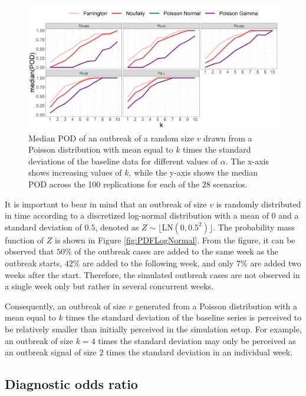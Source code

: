 \documentclass[preprint, 3p, authoryear]{elsarticle} %
\begin{document}
\begin{figure}[H]
\includegraphics[width=1\linewidth]{../../figures/POD_alpha_methods_median} \caption{Median POD of an outbreak of a random size \(v\) drawn from a Poisson distribution with mean equal to \(k\) times the standard deviations of the baseline data for different values of \(\alpha\). The x-axis shows increasing values of \(k\), while the y-axis shows the median POD across the 100 replications for each of the 28 scenarios.}\label{fig:PODalphamethodsmedian}
\end{figure}

It is important to bear in mind that an outbreak of size \(v\) is randomly distributed in time according to a discretized log-normal distribution with a mean of \(0\) and a standard deviation of \(0.5\), denoted as \(Z \sim \lfloor \mathrm{LN}(0,0.5^2)\rfloor\). The probability mass function of \(Z\) is shown in Figure \ref{fig:PDFLogNormal}. From the figure, it can be observed that \(50\%\) of the outbreak cases are added to the same week as the outbreak starts, \(42\%\) are added to the following week, and only \(7\%\) are added two weeks after the start. Therefore, the simulated outbreak cases are not observed in a single week only but rather in several concurrent weeks.

Consequently, an outbreak of size \(v\) generated from a Poisson distribution with a mean equal to \(k\) times the standard deviation of the baseline series is perceived to be relatively smaller than initially perceived in the simulation setup. For example, an outbreak of size \(k=4\) times the standard deviation may only be perceived as an outbreak signal of size \(2\) times the standard deviation in an individual week.

\hypertarget{diagnostic-odds-ratio}{%
\subsection{Diagnostic odds ratio}\label{diagnostic-odds-ratio}}
\end{document}
